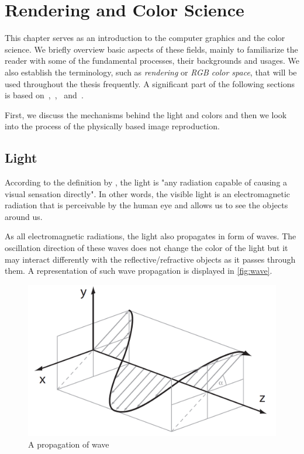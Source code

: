 \chapter{Rendering and Color Science}

This chapter serves as an introduction to the computer graphics and the color science. We briefly overview basic aspects of these fields, mainly to familiarize the reader with some of the fundamental processes, their backgrounds and usages. We also establish the terminology, such as \emph{rendering} or \emph{RGB color space}, that will be used throughout the thesis frequently. A significant part of the following sections is based on~\citet{wyszecki1982color},~\citet{colorScienceSlides},~\citet{nimier2019mitsuba} and~\citet{pharr2016physically}.

First, we discuss the mechanisms behind the light and colors and then we look into the process of the physically based image reproduction.

\section{Light}

According to the definition by \citet{barbrow1964international}, the light is "any radiation capable of causing a visual sensation directly". In other words, the visible light is an electromagnetic radiation that is perceivable by the human eye and allows us to see the objects around us. 

As all electromagnetic radiations, the light also propagates in form of waves. The oscillation direction of these waves does not change the color of the light but it may interact differently with the reflective/refractive objects as it passes through them. A representation of such wave propagation is displayed in \autoref{fig:wave}.

\begin{figure}[h]
	\centering
	\includegraphics[width=0.7\linewidth]{img/wave.png}
	\caption{A propagation of wave~\cite{colorScienceSlides}}
	\label{fig:wave}
\end{figure}


